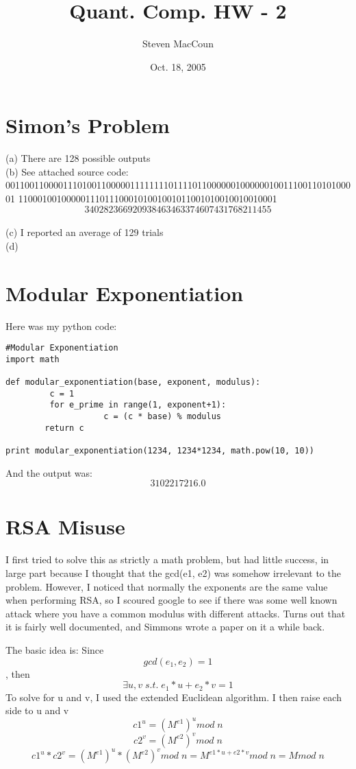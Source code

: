 \documentclass[12pt]{article}
\title{Quant. Comp. HW - 2}
\author{Steven MacCoun}
\date{Oct. 18, 2005}
\begin{document}
\maketitle						%



\section{Simon's Problem}

(a) There are 128 possible outputs
\\(b) See attached source code: \\00110011000011101001100000111111110111101100000010000001001110011010100001
110001001000001110111000101001001011001010010010010001
\[
\boxed{340282366920938463463374607431768211455}
\]
\\(c) I reported an average of 129 trials
\\(d) 

\section{Modular Exponentiation}

Here was my python code:

\begin{verbatim}
#Modular Exponentiation
import math

def modular_exponentiation(base, exponent, modulus):
         c = 1
         for e_prime in range(1, exponent+1):
                    c = (c * base) % modulus
        return c

print modular_exponentiation(1234, 1234*1234, math.pow(10, 10))
\end{verbatim}
And the output was: \[\boxed{3102217216.0}\] 


\section{RSA Misuse}

I first tried to solve this as strictly a math problem, but had little success, in large part because I thought that
the gcd(e1, e2) was somehow irrelevant to the problem. However, I noticed that normally the exponents are the same value
when performing RSA, so I scoured google to see if there was some well known attack where you have a common modulus with
different attacks. Turns out that it is fairly well documented, and Simmons wrote a paper on it a while back.

The basic idea is:
Since \[gcd(e_1,e_2) = 1\],
then \[\exists u, v   \;  s.t.   \;  e_1*u + e_2*v = 1\]
To solve for u and v, I used the extended Euclidean algorithm.
I then raise each side to u and v
\[c1^u = (M^{e1})^{u} mod \; n\]
\[c2^v = (M^{e2})^{v} mod \; n\]
\[c1^u * c2^v =  (M^{e1})^{u}*(M^{e2})^{v} mod \; n =  M^{e1*u + e2*v} mod \; n = M mod \; n\]
\end{document}

